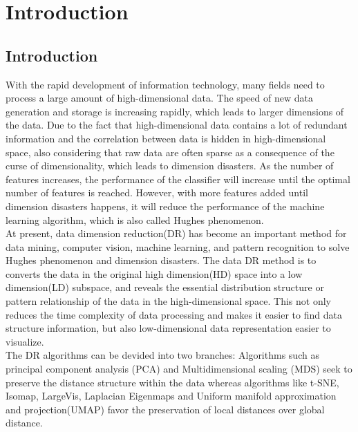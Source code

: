 \part{Introduction} \label{part:how is the conclusion}

\chapter{Introduction}


With the rapid development of information technology, many fields need to process a large amount of high-dimensional data. The speed of new data generation and storage is increasing rapidly, which leads to larger dimensions of the data. Due to the fact that high-dimensional data contains a lot of redundant information and the correlation between data is hidden in high-dimensional space, also considering that raw data are often sparse as a consequence of the curse of dimensionality, which leads to dimension disasters. As the number of features increases, the performance of the classifier will increase until the optimal number of features is reached. However, with more features added until dimension disasters happens, it will reduce the performance of the machine learning algorithm, which is also called Hughes phenomenon.\\

\noindent At present, data dimension reduction(DR) has become an important method for data mining, computer vision, machine learning, and pattern recognition to solve Hughes phenomenon and dimension disasters. The data DR method is to converts the data in the original high dimension(HD) space into a low dimension(LD) subspace, and reveals the essential distribution structure or pattern relationship of the data in the high-dimensional space. This not only reduces the time complexity of data processing and makes it easier to find data structure information, but also low-dimensional data representation easier to visualize.\\

\noindent The DR algorithms can be devided into two branches: Algorithms such as principal component analysis (PCA)\cite{ref10} and Multidimensional scaling (MDS)\cite{ref14} seek to preserve the distance structure within the data whereas algorithms like t-SNE\cite{ref13}, Isomap\cite{ref16}, LargeVis\cite{ref5}, Laplacian Eigenmaps\cite{ref19} and Uniform manifold approximation and projection(UMAP)\cite{ref17} favor the preservation of local distances over global distance.\\
\\

